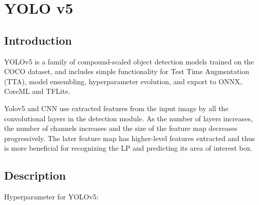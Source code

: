 %
%


\chapter{YOLO v5}


\section{Introduction}

YOLOv5 is a family of compound-scaled object detection models trained on the COCO dataset, and includes simple functionality for Test Time Augmentation (TTA), model ensembling, hyperparameter evolution, and export to ONNX, CoreML and TFLite.

Yolov5 and CNN use extracted features from the input image by all the convolutional layers in the detection module. As the number of layers increases, the number of channels increases and the size of the feature map decreases progressively. \cite{Redmon:2016}
The later feature map has higher-level features extracted and thus is more beneficial for recognizing the LP and predicting its area of interest box. \cite{Ho:2009}


\section{Description}

Hyperparameter for YOLOv5:\cite{OpeneVision:2018}

